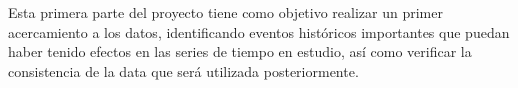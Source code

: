 Esta primera parte del proyecto tiene como objetivo realizar un primer acercamiento a los datos, identificando eventos históricos importantes que puedan haber tenido efectos en las series de tiempo en estudio, así como verificar la consistencia de la data que será utilizada posteriormente.